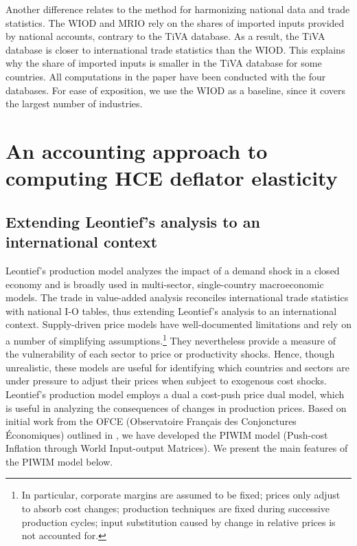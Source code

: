 \documentclass[11pt,a4paper]{paper} %
\begin{document}
Another difference relates to the method for harmonizing national data and trade statistics. The WIOD and MRIO rely on the shares of imported inputs provided by national accounts, contrary to the TiVA database. As a result, the TiVA database is closer to international trade statistics than the WIOD. This explains why the share of imported inputs is smaller in the TiVA database for some countries.
All computations in the paper have been conducted with the four databases.
For ease of exposition, we use the WIOD as a baseline, since it covers the largest number of industries.

\section{An accounting approach to computing HCE deflator elasticity}
\label{sec:metho}

\subsection{Extending Leontief's analysis to an international context}\label{subsec:leontief}

Leontief's production model analyzes the impact of a demand shock in a closed economy \citep{Leontief1951} and is broadly used in multi-sector, single-country macroeconomic models. 
The trade in value-added analysis reconciles international trade statistics with national I-O tables, thus extending Leontief's analysis to an international context.
Supply-driven price models have well-documented limitations \citep{Folloni1994} and rely on a number of simplifying assumptions.\footnote{In particular, corporate margins are assumed to be fixed; prices only adjust to absorb cost changes; production techniques are fixed during successive production cycles; input substitution caused by change in relative prices is not accounted for.}
They nevertheless provide a measure of the vulnerability of each sector to price or productivity shocks. 
Hence, though unrealistic, these models are useful for identifying which countries and sectors are under pressure to adjust their prices when subject to exogenous cost shocks.\\ 
Leontief's production model employs a dual a cost-push price dual model, which is useful in analyzing the consequences of changes in production prices.
Based on initial work from the OFCE (Observatoire Français des Conjonctures Économiques) outlined in \cite{Cochard2016}, we have developed the PIWIM model (Push-cost Inflation through World Input-output Matrices). We present the main features of the PIWIM model below. 
\end{document}
